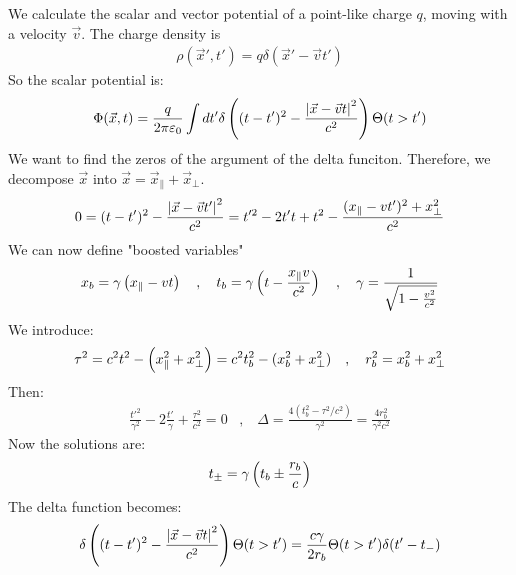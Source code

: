 We calculate the scalar and vector potential of a point-like charge $q$,
moving with a velocity $\vec{v}$. The charge density is
\begin{align*}
    \rho(\vec{x}',t') = q \delta (\vec{x}' - \vec{v} t')
\end{align*}
So the scalar potential is:
\begin{align*}
    \Phi(\vec{x},t) = \frac{q}{2 \pi \varepsilon_0} \int dt' \delta \left( (t - t')^2 - \frac{\left\vert \vec{x} - \vec{v} t \right\vert^2}{c^2} \right) \Theta(t>t')
\end{align*}
We want to find the zeros of the argument of the delta funciton. Therefore,
we decompose $\vec{x}$ into $\vec{x} = \vec{x}_{\parallel} + \vec{x}_{\perp}$.
\begin{align*}
    0 = (t-t')^2 - \frac{\left\vert \vec{x} - \vec{v} t' \right\vert^2 }{c^2}
    = t'^2 - 2 t' t + t^2 - \frac{(x_\parallel - v t')^2 + x_{\perp}^2}{c^2}
\end{align*}
We can now define "boosted variables"
\begin{align*}
    x_b = \gamma \left( x_\parallel - v t \right)
    \hspace{10pt} , \hspace{10pt}
    t_b = \gamma \left( t - \frac{x_\parallel v}{c^2} \right)
    \hspace{10pt} , \hspace{10pt}
    \gamma = \frac{1}{\sqrt{1 - \frac{v^2}{c^2}}}
\end{align*}
We introduce:
\begin{align*}
    \tau^2 = c^2 t^2 - \left( x_\parallel^2 + x_\perp^2 \right)
    = c^2 t_b^2 - (x_b^2 + x_\perp^2)
    \hspace{10pt} , \hspace{10pt}
    r_b^2 = x_b^2 + x_\perp^2
\end{align*}
Then:
\begin{align*}
    \frac{t'^2}{\gamma^2} - 2 \frac{t'}{\gamma} + \frac{\tau^2}{c^2} = 0
    \hspace{10pt} , \hspace{10pt}
    \Delta = \frac{4 (t_b^2 - \tau^2 / c^2)}{\gamma^2} = \frac{4 r_b^2}{\gamma^2 c^2}
\end{align*}
Now the solutions are:
\begin{align*}
    t_{\pm} = \gamma \left( t_b \pm \frac{r_b}{c} \right)
\end{align*}
The delta function becomes:
\begin{align*}
    \delta \left( (t - t')^2 - \frac{\left\vert \vec{x} - \vec{v} t \right\vert^2}{c^2} \right) \Theta(t>t')
    = \frac{c \gamma}{2 r_b} \Theta(t>t') \delta(t' - t_-)
\end{align*}
